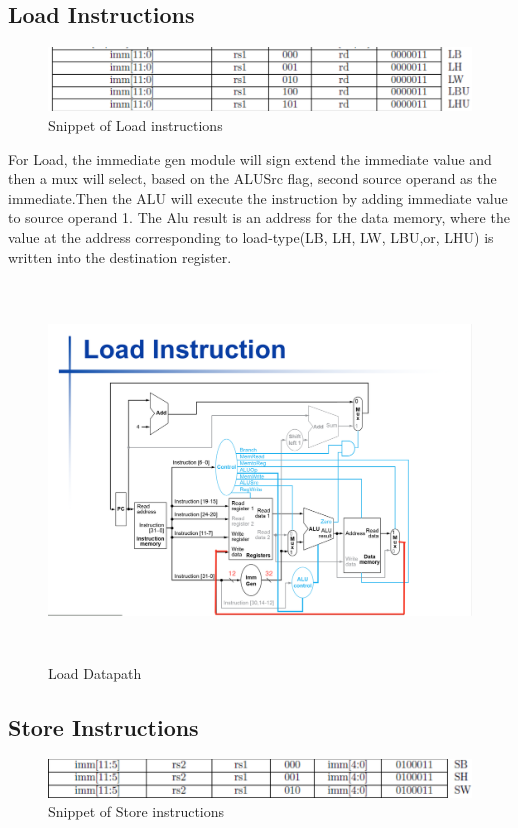 \documentclass[20pt]{article}
\begin{document}
\subsection{Load Instructions}

\begin{figure}[h]
	\includegraphics[width=\linewidth]{Load}
	\caption{Snippet of Load instructions}
\end{figure}

For Load, the immediate gen module will sign extend the immediate value and then a mux will select, based on the ALUSrc flag,  second source operand as the immediate.Then the ALU will execute the instruction by adding immediate value to source operand 1. The Alu result is an address for the data memory, where the value at the address corresponding to load-type(LB, LH, LW, LBU,or, LHU) is written into the destination register. 

\begin{figure}[H]
	\includegraphics[width=\linewidth,height=10cm]{LoadDatapath}
	\caption{Load Datapath}
\end{figure}

\subsection{Store Instructions}
\begin{figure}[H]
	\includegraphics[width=\linewidth]{Store}
	\caption{Snippet of Store instructions}
\end{figure}
\end{document}
